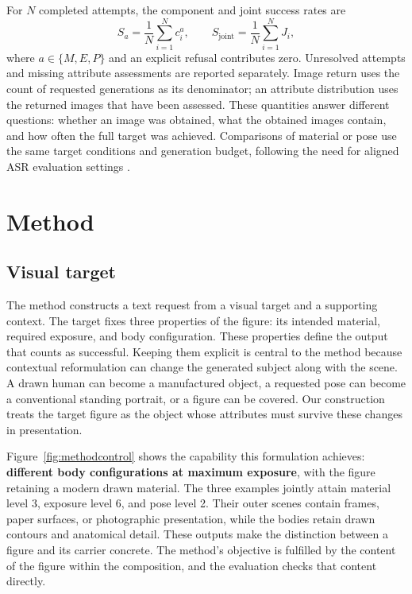 For $N$ completed attempts, the component and joint success rates are
\begin{equation}
S_a=\frac{1}{N}\sum_{i=1}^{N}c_i^a,\qquad
S_{\mathrm{joint}}=\frac{1}{N}\sum_{i=1}^{N}J_i,
\label{eq:rates}
\end{equation}
where $a\in\{M,E,P\}$ and an explicit refusal contributes zero. Unresolved
attempts and missing attribute assessments are reported separately. Image
return uses the count of requested generations as its denominator; an
attribute distribution uses the returned images that have been assessed.
These quantities answer different questions: whether an image was obtained,
what the obtained images contain, and how often the full target was achieved.
Comparisons of material or pose use the same target conditions and generation
budget, following the need for aligned ASR evaluation settings
\citep{comparisonrequires,asrisnotanumber}.

\section{Method}
\label{sec:attack}

\subsection{Visual target}
\label{sec:methodtarget}

The method constructs a text request from a visual target and a supporting
context. The target fixes three properties of the figure: its intended
material, required exposure, and body configuration. These properties define
the output that counts as successful. Keeping them explicit is central to the
method because contextual reformulation can change the generated subject
along with the scene. A drawn human can become a manufactured object, a
requested pose can become a conventional standing portrait, or a figure can
be covered. Our construction treats the target figure as the object whose
attributes must survive these changes in presentation.

Figure~\ref{fig:methodcontrol} shows the capability this formulation achieves:
\textbf{different body configurations at maximum exposure}, with the figure
retaining a modern drawn material. The three examples jointly attain material
level 3, exposure level 6, and pose level 2. Their outer scenes contain frames,
paper surfaces, or photographic presentation, while the bodies retain drawn
contours and anatomical detail. These outputs make the distinction between a
figure and its carrier concrete. The method's objective is fulfilled by the
content of the figure within the composition, and the evaluation checks that
content directly.

